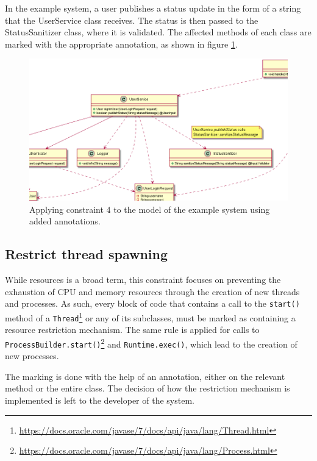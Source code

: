 In the example system, a user publishes a status update in the form of a string that the UserService class receives. The status is then passed to the StatusSanitizer class, where it is validated. The affected methods of each class are marked with the appropriate annotation, as shown in figure \ref{fig:validate_input_toy_system}.  

\begin{figure}
    \centering
    \includegraphics[width=\textwidth]{figure/toyexamples/validate_input_toy_system.png}
    \caption{Applying constraint 4 to the model of the example system using added annotations.}
    \label{fig:validate_input_toy_system}
\end{figure}

\subsection{Restrict thread spawning}
While resources is a broad term, this constraint focuses on preventing the exhaustion of CPU and memory resources through the creation of new threads and processes. As such, every block of code that contains a call to the \texttt{start()} method of a \texttt{Thread}\footnote{\url{https://docs.oracle.com/javase/7/docs/api/java/lang/Thread.html}} or any of its subclasses, must be marked as containing a resource restriction mechanism. The same rule is applied for calls to \texttt{ProcessBuilder.start()}\footnote{\url{https://docs.oracle.com/javase/7/docs/api/java/lang/Process.html}} and \texttt{Runtime.exec()}\footnotemark[3], which lead to the creation of new processes.

The marking is done with the help of an annotation, either on the relevant method or the entire class. The decision of how the restriction mechanism is implemented is left to the developer of the system.

